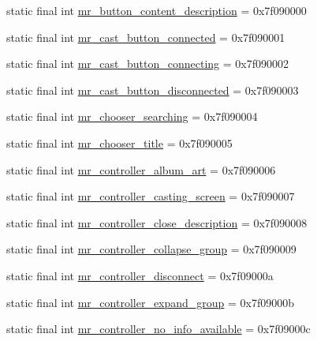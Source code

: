 \begin{CompactItemize}
\item 
static final int \hyperlink{classandroid_1_1support_1_1v4_1_1_r_1_1string_a13e9775777dc6311973637db684950f}{mr\_\-button\_\-content\_\-description} = 0x7f090000
\item 
static final int \hyperlink{classandroid_1_1support_1_1v4_1_1_r_1_1string_87fc94956059c4315a1627f5e2f99431}{mr\_\-cast\_\-button\_\-connected} = 0x7f090001
\item 
static final int \hyperlink{classandroid_1_1support_1_1v4_1_1_r_1_1string_9dcd80125cb973d2a94ad7bc6565ae69}{mr\_\-cast\_\-button\_\-connecting} = 0x7f090002
\item 
static final int \hyperlink{classandroid_1_1support_1_1v4_1_1_r_1_1string_eebee8a9025ae13c255fcc36da088181}{mr\_\-cast\_\-button\_\-disconnected} = 0x7f090003
\item 
static final int \hyperlink{classandroid_1_1support_1_1v4_1_1_r_1_1string_f8aa34db05a5674af82944fd1a5d85fa}{mr\_\-chooser\_\-searching} = 0x7f090004
\item 
static final int \hyperlink{classandroid_1_1support_1_1v4_1_1_r_1_1string_c62be1482d0971086f9caa71a510fb57}{mr\_\-chooser\_\-title} = 0x7f090005
\item 
static final int \hyperlink{classandroid_1_1support_1_1v4_1_1_r_1_1string_85b09768a0b9cfebf1fa4b107680f1c8}{mr\_\-controller\_\-album\_\-art} = 0x7f090006
\item 
static final int \hyperlink{classandroid_1_1support_1_1v4_1_1_r_1_1string_585f01b874b0175d2a99afcc579431da}{mr\_\-controller\_\-casting\_\-screen} = 0x7f090007
\item 
static final int \hyperlink{classandroid_1_1support_1_1v4_1_1_r_1_1string_362723ffe0e0af604e33e5fc8e5d4dbb}{mr\_\-controller\_\-close\_\-description} = 0x7f090008
\item 
static final int \hyperlink{classandroid_1_1support_1_1v4_1_1_r_1_1string_6dfce5ff6b5ad83eca0a007695125e8b}{mr\_\-controller\_\-collapse\_\-group} = 0x7f090009
\item 
static final int \hyperlink{classandroid_1_1support_1_1v4_1_1_r_1_1string_4ae9d31a8532bfbb1f897e22f0a85426}{mr\_\-controller\_\-disconnect} = 0x7f09000a
\item 
static final int \hyperlink{classandroid_1_1support_1_1v4_1_1_r_1_1string_7808eb42cf2d68b4123854f96e9383d9}{mr\_\-controller\_\-expand\_\-group} = 0x7f09000b
\item 
static final int \hyperlink{classandroid_1_1support_1_1v4_1_1_r_1_1string_4e8460812b5c0bb3a6b30506d3dc4935}{mr\_\-controller\_\-no\_\-info\_\-available} = 0x7f09000c

\end{CompactItemize}
